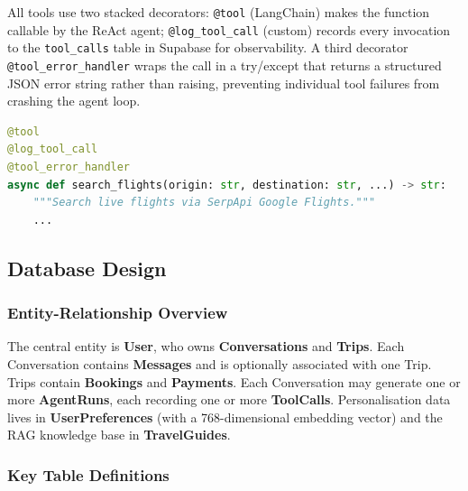 \documentclass[12pt, a4paper]{article}
\begin{document}
All tools use two stacked decorators: \texttt{@tool} (LangChain) makes the function callable by the ReAct agent; \texttt{@log\_tool\_call} (custom) records every invocation to the \texttt{tool\_calls} table in Supabase for observability. A third decorator \texttt{@tool\_error\_handler} wraps the call in a try/except that returns a structured JSON error string rather than raising, preventing individual tool failures from crashing the agent loop.

\begin{lstlisting}[language=Python, caption=Tool Decorator Stack]
@tool
@log_tool_call
@tool_error_handler
async def search_flights(origin: str, destination: str, ...) -> str:
    """Search live flights via SerpApi Google Flights."""
    ...
\end{lstlisting}

\subsection{Database Design}

\subsubsection{Entity-Relationship Overview}

The central entity is \textbf{User}, who owns \textbf{Conversations} and \textbf{Trips}. Each Conversation contains \textbf{Messages} and is optionally associated with one Trip. Trips contain \textbf{Bookings} and \textbf{Payments}. Each Conversation may generate one or more \textbf{AgentRuns}, each recording one or more \textbf{ToolCalls}. Personalisation data lives in \textbf{UserPreferences} (with a 768-dimensional embedding vector) and the RAG knowledge base in \textbf{TravelGuides}.

\subsubsection{Key Table Definitions}
\end{document}
